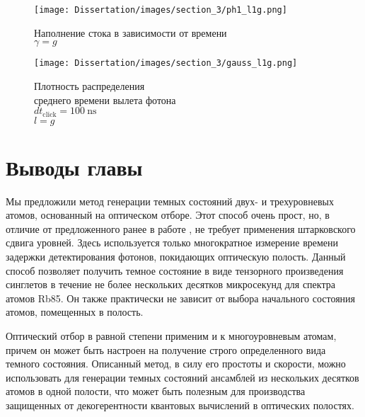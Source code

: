 \begin{figure}[ht!]
	\texttt{[image: Dissertation/images/section\_3/ph1\_l1g.png]}
	\captionsetup{format=hang,width=0.8\textwidth,justification=centering,singlelinecheck=no}
	\caption{
		Наполнение стока  в зависимости от времени\\ 
		$\gamma = g$
	}
	\label{fig:csignga}
\end{figure}

\begin{figure}[ht!]
	\noindent\centering\texttt{[image: Dissertation/images/section\_3/gauss\_l1g.png]}
	\captionsetup{format=hang,width=0.8\textwidth,justification=centering,singlelinecheck=no}
	\caption{
		Плотность распределения\\среднего времени вылета фотона\\
		$dt_{\text{click}}= 100~\text{ns}$\\
		$l = g$
	}
	\label{fig:csignga1}
\end{figure}

\clearpage
\section{Выводы главы}\label{sec:ch3/sect5}
Мы предложили метод генерации темных состояний двух- и трехуровневых атомов, основанный на оптическом отборе. Этот способ очень прост, но, в отличие от предложенного ранее в работе \cite{dark_states_properties_tanamoto}, не требует применения штарковского сдвига уровней. Здесь используется только многократное измерение времени задержки детектирования фотонов, покидающих оптическую полость. Данный способ позволяет получить темное состояние в виде тензорного произведения синглетов в течение не более нескольких десятков микросекунд для спектра атомов Rb85. Он также практически не зависит от выбора начального состояния атомов, помещенных в полость.

Оптический отбор в равной степени применим и к многоуровневым атомам, причем он может быть настроен на получение строго определенного вида темного состояния. Описанный метод, в силу его простоты и скорости, можно использовать для генерации темных состояний ансамблей из нескольких десятков атомов в одной полости, что может быть полезным для производства защищенных от декогерентности квантовых вычислений в оптических полостях.
